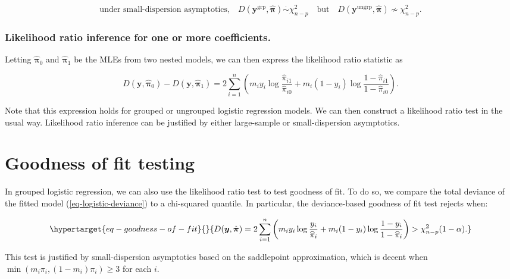 \documentclass[
  11pt,
  letterpaper,
  oneside]{book}
\theoremstyle{plain}
\theoremstyle{plain}
\theoremstyle{definition}
\theoremstyle{definition}
\theoremstyle{plain}
\theoremstyle{remark}
\begin{document}
\[
\text{under small-dispersion asymptotics,} \quad D(\boldsymbol y^{\text{grp}}, \hat{\boldsymbol \pi}) \overset \cdot \sim \chi^2_{n-p} \quad \text{but} \quad D(\boldsymbol y^{\text{ungrp}}, \hat{\boldsymbol \pi}) \not \sim \chi^2_{n-p}.
\]

\hypertarget{sec-likelihood-ratio-test}{%
\subsubsection{Likelihood ratio inference for one or more
coefficients.}\label{sec-likelihood-ratio-test}}

Letting \(\boldsymbol{\widehat \pi}_0\) and
\(\boldsymbol{\widehat \pi}_1\) be the MLEs from two nested models, we
can then express the likelihood ratio statistic as

\[
D(\boldsymbol y, \boldsymbol{\widehat \pi}_0) - D(\boldsymbol y, \boldsymbol{\widehat \pi}_1) = 2\sum_{i = 1}^n \left(m_i y_i \log \frac{\widehat \pi_{i1}}{\widehat \pi_{i0}} + m_i(1-y_i) \log\frac{1-\widehat \pi_{i1}}{1-\widehat \pi_{i0}}\right).
\]

Note that this expression holds for grouped or ungrouped logistic
regression models. We can then construct a likelihood ratio test in the
usual way. Likelihood ratio inference can be justified by either
large-sample or small-dispersion asymptotics.

\hypertarget{sec-goodness-of-fit}{%
\section{Goodness of fit testing}\label{sec-goodness-of-fit}}

In grouped logistic regression, we can also use the likelihood ratio
test to test goodness of fit. To do so, we compare the total deviance of
the fitted model (\ref{eq-logistic-deviance}) to a chi-squared quantile.
In particular, the deviance-based goodness of fit test rejects when:

\begin{equation}\protect\hypertarget{eq-goodness-of-fit}{}{
D(\boldsymbol{y}, \hat{\boldsymbol{\pi}}) = 2\sum_{i = 1}^n \left(m_i y_i \log \frac{y_i}{\widehat \pi_i} + m_i(1-y_i) \log\frac{1-y_i}{1-\widehat \pi_i}\right) > \chi^2_{n-p}(1-\alpha).
}\label{eq-goodness-of-fit}\end{equation}

This test is justified by small-dispersion asymptotics based on the
saddlepoint approximation, which is decent when
\(\min(m_i \pi_i, (1-m_i)\pi_i) \geq 3\) for each \(i\).
\end{document}
